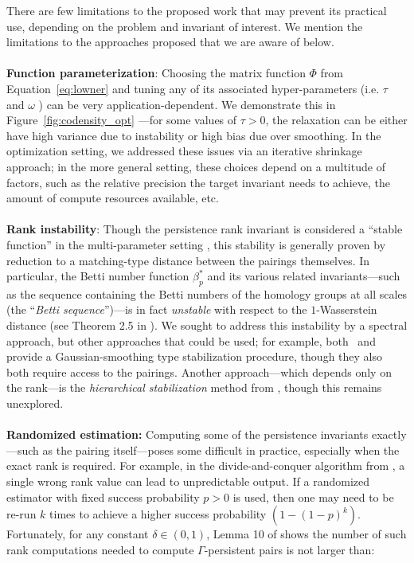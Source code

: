 \documentclass[pdflatex,sn-mathphys-num]{sn-jnl}
\begin{document}
There are few limitations to the proposed work that may prevent its practical use, depending on the problem and invariant of interest. We mention the limitations to the approaches proposed that we are aware of below.
\\
\\
\noindent \textbf{Function parameterization}: Choosing the matrix function \(\Phi\) from Equation~\ref{eq:lowner} and tuning any of its associated hyper-parameters (i.e. \(\tau\) and \(\omega\) ) can be very application-dependent. We demonstrate this in Figure~\ref{fig:codensity_opt} ---for some values of \(\tau > 0\), the relaxation can be either have high variance due to instability or high bias due over smoothing. In the optimization setting, we addressed these issues via an iterative shrinkage approach; in the more general setting, these choices depend on a multitude of factors, such as the relative precision the target invariant needs to achieve, the amount of compute resources available, etc. 
\\
\\
\noindent \textbf{Rank instability}: Though the persistence rank invariant is considered a ``stable function'' in the multi-parameter setting \cite{cerri2013betti}, this stability is generally proven by reduction to a matching-type distance between the pairings themselves. In particular, the Betti number function \(\beta_{p}^{\ast}\) and its various related invariants---such as the sequence containing the Betti numbers of the homology groups at all scales (the ``\emph{Betti sequence}'')---is in fact \emph{unstable} with respect to the \(1\)-Wasserstein distance (see Theorem 2.5 in \cite{johnson2021instability}). We sought to address this instability by a spectral approach, but other approaches that could be used; for example, both~\cite{johnson2021instability} and~\cite{adams2017persistence} provide a Gaussian-smoothing type stabilization procedure, though they also both require access to the pairings. Another approach---which depends only on the rank---is the \emph{hierarchical stabilization} method from \cite{gafvert2017stable}, though this remains unexplored.
\\
\\
\noindent \textbf{Randomized estimation:} Computing some of the persistence invariants exactly---such as the pairing itself---poses some difficult in practice, especially when the exact rank is required. For example, in the divide-and-conquer algorithm from \cite{chen2011output}, a single wrong rank value can lead to unpredictable output. If a randomized estimator with fixed success probability \(p > 0\) is used, then one may need to be re-run \(k\) times to achieve a higher success probability \(\left( 1 - (1 - p)^{k} \right)\). Fortunately, for any constant \(\delta \in (0,1)\), Lemma 10 of \cite{chen2011output} shows the number of such rank computations needed to compute \(\Gamma\)-persistent pairs is not larger than:
\end{document}
